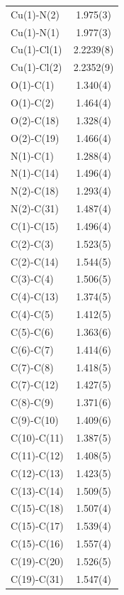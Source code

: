 \begin{center}
\tablefirsthead{%
\toprule}
\tablelasttail{\bottomrule}
{\footnotesize \singlespacing
\begin{supertabular}{p{1.5in}c}
Cu(1)-N(2) &1.975(3)\\
Cu(1)-N(1) &1.977(3)\\
Cu(1)-Cl(1) &2.2239(8)\\
Cu(1)-Cl(2) &2.2352(9)\\
O(1)-C(1) &1.340(4)\\
O(1)-C(2) &1.464(4)\\
O(2)-C(18) &1.328(4)\\
O(2)-C(19) &1.466(4)\\
N(1)-C(1) &1.288(4)\\
N(1)-C(14) &1.496(4)\\
N(2)-C(18) &1.293(4)\\
N(2)-C(31) &1.487(4)\\
C(1)-C(15) &1.496(4)\\
C(2)-C(3) &1.523(5)\\
C(2)-C(14) &1.544(5)\\
C(3)-C(4) &1.506(5)\\
C(4)-C(13) &1.374(5)\\
C(4)-C(5) &1.412(5)\\
C(5)-C(6) &1.363(6)\\
C(6)-C(7) &1.414(6)\\
C(7)-C(8) &1.418(5)\\
C(7)-C(12) &1.427(5)\\
C(8)-C(9) &1.371(6)\\
C(9)-C(10) &1.409(6)\\
C(10)-C(11) &1.387(5)\\
C(11)-C(12) &1.408(5)\\
C(12)-C(13) &1.423(5)\\
C(13)-C(14) &1.509(5)\\
C(15)-C(18) &1.507(4)\\
C(15)-C(17) &1.539(4)\\
C(15)-C(16) &1.557(4)\\
C(19)-C(20) &1.526(5)\\
C(19)-C(31) &1.547(4)\\

\end{supertabular}}
\end{center}
